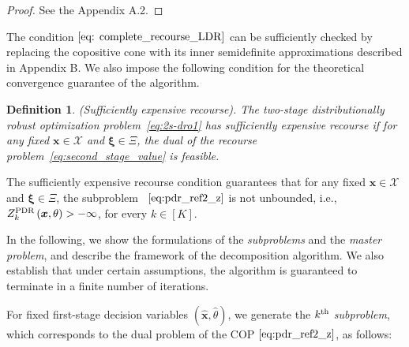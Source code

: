 \documentclass{article}
\newtheorem{defi}{Definition}
\begin{document}
\begin{proof}
See the Appendix A.2.
\end{proof}
The condition $\eqref{eq: complete_recourse_LDR}$ can be sufficiently checked by replacing the copositive cone with its inner semidefinite approximations described in Appendix B. %
We also impose the following condition for the theoretical convergence guarantee of the algorithm. 

\begin{defi}
\textup{(Sufficiently expensive recourse)}. The two-stage distributionally robust optimization problem~\eqref{eq:2s-dro1} has sufficiently expensive recourse if for any fixed $\bm x \in \mathcal{X}$ and $\bm \xi \in \Xi$, the dual of the recourse problem~\eqref{eq:second_stage_value} is feasible. 
\end{defi}
\noindent %
The sufficiently expensive recourse condition guarantees that for any fixed $\bm x \in \mathcal{X}$ and $\bm \xi \in \Xi$, the subproblem~%
$\eqref{eq:pdr_ref2_z}$ is not unbounded, i.e., $Z^{\textup{PDR}}_k \left(\bm x, \theta \right) > -\infty$, for every $k \in [K]$.

In the following, we show the formulations of the \textit{subproblems} and the \textit{master problem}, and describe the framework of the decomposition algorithm. We also establish that under certain assumptions, the algorithm is guaranteed to terminate in a finite number of iterations.

For fixed first-stage decision variables $(\hat{\bm x}, \hat{\theta})$, we generate the $k^{\textup{th}}$ \textit{subproblem}, which corresponds to the dual problem of the COP $\eqref{eq:pdr_ref2_z}$, as follows:
\end{document}
